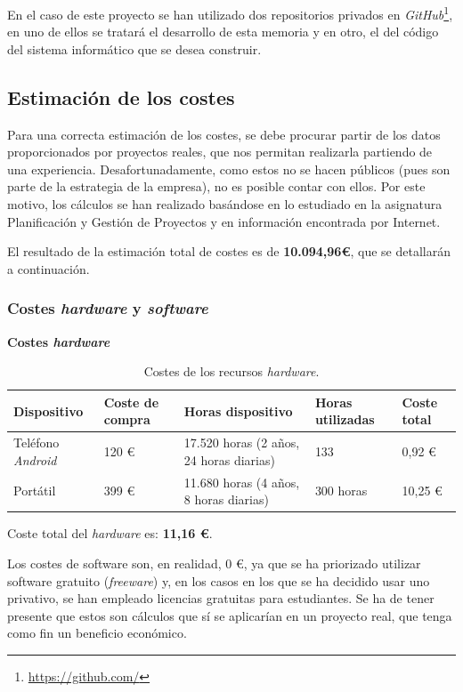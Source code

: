 \documentclass[twoside]{report}
\begin{document}
En el caso de este proyecto se han utilizado dos repositorios privados en \textit{GitHub}\footnote{\url{https://github.com/}}, en uno de ellos se tratará el desarrollo de esta memoria y en otro, el del código del sistema informático que se desea construir.

\subsection{Estimación de los costes}

Para una correcta estimación de los costes, se debe procurar partir de los datos proporcionados por proyectos reales, que nos permitan realizarla partiendo de una experiencia. Desafortunadamente, como estos no se hacen públicos (pues son parte de la estrategia de la empresa), no es posible contar con ellos. Por este motivo, los cálculos se han realizado basándose en lo estudiado en la asignatura Planificación y Gestión de Proyectos \cite{pgptema2} y en información encontrada por Internet.

El resultado de la estimación total de costes es de \textbf{10.094,96\euro}, que se detallarán a continuación.

\subsubsection{Costes \textit{hardware} y \textit{software}}
\textbf{Costes \textit{hardware}}
\begin{table}[H]
\center
\begin{tabular}{|l|l|l|l|l|}
\hline
Dispositivo        & Coste de compra   & Horas dispositivo & Horas utilizadas & Coste total \\ \hline
Teléfono \textit{Android}   & 120 \euro      & 17.520 horas (2 años, 24 horas diarias)  & 133  & 0,92  \euro \\ \hline
Portátil      & 399 \euro   &  11.680 horas (4 años, 8 horas diarias) & 300 horas  & 10,25 \euro \\ \hline
\end{tabular}
\caption{Costes de los recursos \textit{hardware}.}
\end{table}

Coste total del \textit{hardware} es: \textbf{11,16 \euro}.

Los costes de software son, en realidad, 0 \euro, ya que se ha priorizado utilizar software gratuito (\textit{freeware}) y,  en los casos en los que se ha decidido usar uno privativo, se han empleado licencias gratuitas para estudiantes. Se ha de tener presente que estos son cálculos que sí se aplicarían en un proyecto real, que tenga como fin un beneficio económico.
\end{document}
